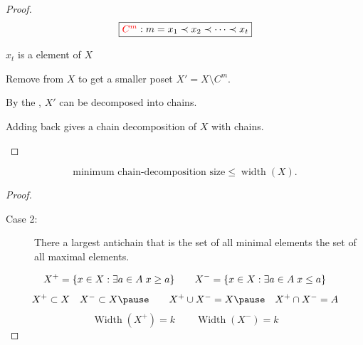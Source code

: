 \begin{frame}{}
  \begin{proof}
    \[
      \fbox{$\textcolor{red}{C^{m}}: m = x_{1} \prec x_{2} \prec \cdots \prec x_{t}$}
    \]

    \begin{center}
      $x_{t}$ is a  element of $X$

      \pause
      \vspace{0.30cm}
      Remove  from $X$ to get a smaller poset $X' = X \setminus C^{m}$.

      \pause
      \vspace{1em}

      \pause
      \vspace{0.30cm}
      {\small
        By the ,
        $X'$ can be decomposed into  chains.}

      \pause
      \vspace{0.30cm}
      {\small Adding  back gives a chain decomposition
      of $X$ with  chains.}
    \end{center}
  \end{proof}
\end{frame}

\begin{frame}{}
  \begin{lemma}
    \[
      \text{minimum chain-decomposition size} \le \operatorname{width}(X).
    \]
  \end{lemma}

  \begin{proof}
    \begin{description}
      \item[Case 2:]
        There  a largest antichain
        that is  the set of all minimal elements
         the set of all maximal elements.
    \end{description}

    \pause
    \vspace{-0.30cm}
    \[
      X^{+} = \{x \in X: \exists a \in A\; x \ge a\}
      \qquad
      X^{-} = \{x \in X: \exists a \in A\; x \le a\}
    \]
    \pause
    \vspace{-0.30cm}
    \[
      X^{+} \subset X \quad X^{-} \subset X
      \pause\qquad
      X^{+} \cup X^{-} = X \pause \quad X^{+} \cap X^{-} = A
    \]
    \pause
    \vspace{-0.30cm}
    \[
      \operatorname{Width}(X^{+}) = k
      \qquad
      \operatorname{Width}(X^{-}) = k
    \]
  \end{proof}
\end{frame}

